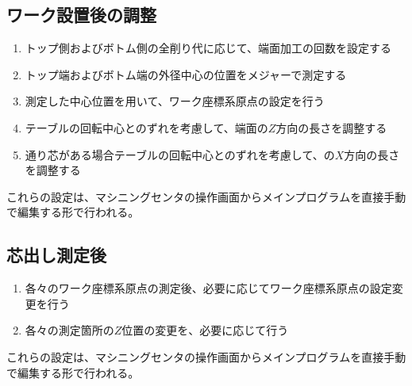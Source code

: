 \clearpage
\subsection{ワーク設置後の調整}
\begin{enumerate}
\item トップ側およびボトム側の全削り代に応じて、端面加工の回数を設定する
\item トップ端およびボトム端の外径中心の位置をメジャーで測定する
\item 測定した中心位置を用いて、ワーク座標系原点の設定を行う
\item {}テーブルの回転中心とのずれを考慮して、端面の$Z$方向の長さを調整する
\item {}通り芯がある場合テーブルの回転中心とのずれを考慮して、の$X$方向の長さを調整する
\end{enumerate}
これらの設定は、マシニングセンタの操作画面からメインプログラムを直接手動で編集する形で行われる。



\clearpage


\subsection{芯出し測定後}
\begin{enumerate}
\item 各々のワーク座標系原点の測定後、必要に応じてワーク座標系原点の設定変更を行う
\item 各々の測定箇所の$Z$位置の変更を、必要に応じて行う
\end{enumerate}
これらの設定は、マシニングセンタの操作画面からメインプログラムを直接手動で編集する形で行われる。


